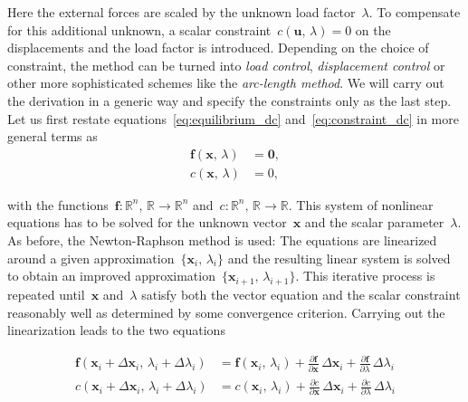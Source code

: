 Here the external forces are scaled by the unknown load factor~$\lambda$. To compensate for this additional unknown, a scalar constraint~$c(\boldsymbol{u},\,\lambda) = 0$ on the displacements and the load factor is introduced.
Depending on the choice of constraint, the method can be turned into \textit{load control}, \textit{displacement control} or other more sophisticated schemes like the \textit{arc-length method}.
We will carry out the derivation in a generic way and specify the constraints only as the last step.
Let us first restate equations~\eqref{eq:equilibrium_dc} and~\eqref{eq:constraint_dc} in more general terms as
%
\begin{align}
\boldsymbol{f}(\boldsymbol{x},\,\lambda) &= \boldsymbol{0}, \label{eq:equilibrium_dc_gen} \\
c(\boldsymbol{x},\,\lambda) &= 0, \label{eq:constraint_dc_gen}
\end{align}

with the functions~$\boldsymbol{f}: \mathbb{R}^n,\,\mathbb{R} \rightarrow \mathbb{R}^n$ and~$c: \mathbb{R}^n,\,\mathbb{R} \rightarrow \mathbb{R}$.
This system of nonlinear equations has to be solved for the unknown vector~$\boldsymbol{x}$ and the scalar parameter~$\lambda$.
As before, the Newton-Raphson method is used: The equations are linearized around a given approximation~$\{\boldsymbol{x}_i,\,\lambda_i\}$ and the resulting linear system is solved to obtain an improved approximation~$\{\boldsymbol{x}_{i+1},\,\lambda_{i+1}\}$.
This iterative process is repeated until~$\boldsymbol{x}$ and~$\lambda$ satisfy both the vector equation and the scalar constraint reasonably well as determined by some convergence criterion.
Carrying out the linearization leads to the two equations

\begin{align}
\boldsymbol{f}(\boldsymbol{x}_{i} + \Delta\boldsymbol{x}_{i},\,\lambda_{i} + \Delta\lambda_{i}) &= \boldsymbol{f}(\boldsymbol{x}_{i},\,\lambda_{i}) + \frac{\partial\boldsymbol{f}}{\partial\boldsymbol{x}}\,\Delta\boldsymbol{x}_{i} + \frac{\partial\boldsymbol{f}}{\partial\lambda}\,\Delta\lambda_{i} \label{eq:equilibrium_dc_lin} \\
c(\boldsymbol{x}_{i} + \Delta\boldsymbol{x}_{i},\,\lambda_{i} + \Delta\lambda_{i}) &= c(\boldsymbol{x}_{i},\,\lambda_{i}) + \frac{\partial c}{\partial\boldsymbol{x}}\,\Delta\boldsymbol{x}_{i} + \frac{\partial c}{\partial\lambda}\,\Delta\lambda_{i} \label{eq:constraints_dc_lin}
\end{align}

